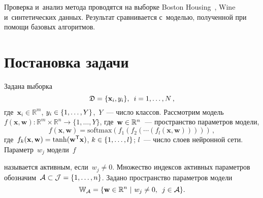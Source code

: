 \begin{multicols}{2}
Проверка и~анализ метода проводятся на выборке Boston Housing~\cite{Boston}, 
Wine~\cite{Wine} и~синтетических данных. Результат сравнивается с~моделью, 
полученной при помощи базовых алгоритмов.

\vspace*{-9pt}

\section{Постановка задачи}

Задана выборка
\begin{equation*}
\mathfrak{D} = \{\mathbf{x}_i,y_i\},\enskip  i =1,\ldots,N\,, 
\end{equation*}
где~$\mathbf{x}_i \in \mathbb{R}^{m}$, $y_i \hm\in \{1, \ldots, Y\}$,~$Y$~--- число 
классов.
Рассмотрим модель~$f(\mathbf{x}, \mathbf{w}): \mathbb{R}^m \times \mathbb{R}^n 
\to \{1,\ldots,Y\}$, где~$\mathbf{w}\hm \in \mathbb{R}^n$~--- пространство 
параметров модели,
\begin{equation*}
f(\mathbf{x}, \mathbf{w}) = \mathrm{softmax}
\left( f_1\left( f_2\left( \cdots \left(f_l(\mathbf{x}, 
\mathbf{w})\right)\right)\right)\right)\,, 
\end{equation*}
где~$f_k(\mathbf{x}, \mathbf{w}) \hm=  
\mathrm{tanh}(\mathbf{w}^\mathsf{T}\mathbf{x})$,
 $k \hm\in \{1,\ldots ,l\}$; $l$~--- чис\-ло слоев нейронной 
сети.
Параметр~$w_j$ модели~$f$\linebreak\vspace*{-12pt}

\pagebreak

\noindent
  называется активным, если~$w_j \not = 0$. Множество 
индексов активных па\-ра\-мет\-ров обозначим~$\mathcal{A} \hm\subset \mathcal{J} \hm= 
\{1,\ldots ,n\}$.
Задано пространство па\-ра\-мет\-ров модели
\begin{equation*}
\mathbb{W_\mathcal{A}} = \{ \textbf{w} \in \mathbb{R}^n~|~w_j\not=0,\enskip j \in 
\mathcal{A}  \}. %
\end{equation*}



\end{multicols}
